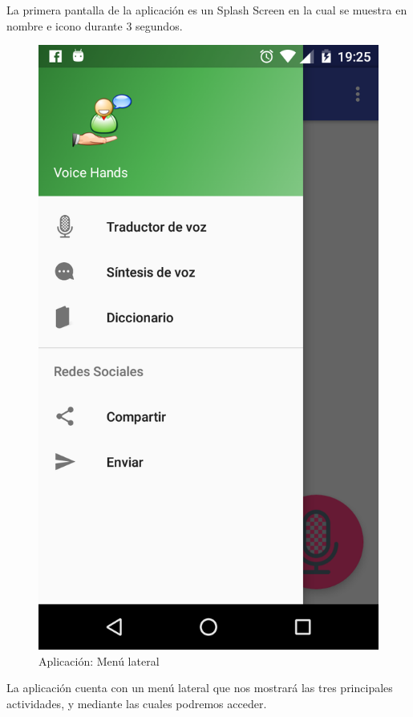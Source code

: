 La primera pantalla de la aplicación es un Splash Screen en la cual se muestra en nombre e icono durante 3 segundos.

\begin{figure}[H]
	\centering
	\includegraphics[scale = 0.2]{figures/app02}
	\caption{Aplicación: Menú lateral}
	\label{fig:app03}
\end{figure}

La aplicación cuenta con un menú lateral que nos mostrará las tres principales actividades, y mediante las cuales podremos acceder.

